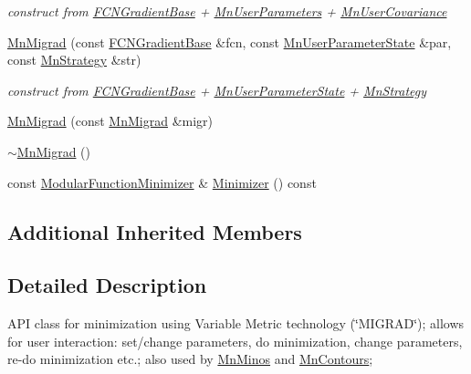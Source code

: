 \begin{DoxyCompactItemize}
\begin{DoxyCompactList}\small\item\em construct from \mbox{\hyperlink{classROOT_1_1Minuit2_1_1FCNGradientBase}{F\+C\+N\+Gradient\+Base}} + \mbox{\hyperlink{classROOT_1_1Minuit2_1_1MnUserParameters}{Mn\+User\+Parameters}} + \mbox{\hyperlink{classROOT_1_1Minuit2_1_1MnUserCovariance}{Mn\+User\+Covariance}} \end{DoxyCompactList}\item 
\mbox{\hyperlink{classROOT_1_1Minuit2_1_1MnMigrad_a0397e5984ab0d0163e69315b40a3d520}{Mn\+Migrad}} (const \mbox{\hyperlink{classROOT_1_1Minuit2_1_1FCNGradientBase}{F\+C\+N\+Gradient\+Base}} \&fcn, const \mbox{\hyperlink{classROOT_1_1Minuit2_1_1MnUserParameterState}{Mn\+User\+Parameter\+State}} \&par, const \mbox{\hyperlink{classROOT_1_1Minuit2_1_1MnStrategy}{Mn\+Strategy}} \&str)
\begin{DoxyCompactList}\small\item\em construct from \mbox{\hyperlink{classROOT_1_1Minuit2_1_1FCNGradientBase}{F\+C\+N\+Gradient\+Base}} + \mbox{\hyperlink{classROOT_1_1Minuit2_1_1MnUserParameterState}{Mn\+User\+Parameter\+State}} + \mbox{\hyperlink{classROOT_1_1Minuit2_1_1MnStrategy}{Mn\+Strategy}} \end{DoxyCompactList}\item 
\mbox{\hyperlink{classROOT_1_1Minuit2_1_1MnMigrad_a992fa22c62be692f5cd8f781c73475e0}{Mn\+Migrad}} (const \mbox{\hyperlink{classROOT_1_1Minuit2_1_1MnMigrad}{Mn\+Migrad}} \&migr)
\item 
\mbox{\hyperlink{classROOT_1_1Minuit2_1_1MnMigrad_a7a415c2b0378cf8f4606e53b7d20ae63}{$\sim$\+Mn\+Migrad}} ()
\item 
const \mbox{\hyperlink{classROOT_1_1Minuit2_1_1ModularFunctionMinimizer}{Modular\+Function\+Minimizer}} \& \mbox{\hyperlink{classROOT_1_1Minuit2_1_1MnMigrad_a98fa0ce74bf180a287093ac677e8644c}{Minimizer}} () const
\end{DoxyCompactItemize}
\subsection*{Additional Inherited Members}


\subsection{Detailed Description}
A\+PI class for minimization using Variable Metric technology (\char`\"{}\+M\+I\+G\+R\+A\+D\char`\"{}); allows for user interaction\+: set/change parameters, do minimization, change parameters, re-\/do minimization etc.; also used by \mbox{\hyperlink{classROOT_1_1Minuit2_1_1MnMinos}{Mn\+Minos}} and \mbox{\hyperlink{classROOT_1_1Minuit2_1_1MnContours}{Mn\+Contours}}; 

